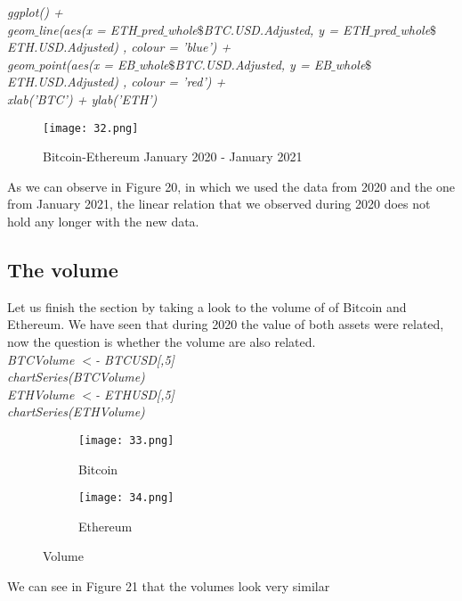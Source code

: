 \documentclass[14pt]{amsart}
\begin{document}
\noindent \textit{ggplot() +}\\
\indent \textit{geom$\_$line(aes(x = ETH$\_$pred$\_$whole$\$$BTC.USD.Adjusted, y = ETH$\_$pred$\_$whole$\$$ETH.USD.Adjusted) , colour = 'blue') +}\\
\indent \textit{geom$\_$point(aes(x = EB$\_$whole$\$$BTC.USD.Adjusted, y = EB$\_$whole$\$$ETH.USD.Adjusted) , colour = 'red') +}\\
\indent \textit{xlab('BTC') + ylab('ETH')}\\

\begin{figure}[h!]
  \texttt{[image: 32.png]}
  \caption{Bitcoin-Ethereum January 2020 - January 2021}
  \label{fig:boat1}
\end{figure}

As we can observe in Figure 20, in which we used the data from 2020 and the one from January 2021, the linear relation that we observed during 2020 does not hold any longer with the new data.

\subsection{The volume}
Let us finish the section by taking a look to the volume of of Bitcoin and Ethereum. We have seen that during 2020 the value of both assets were related, now the question is whether the volume are also related.\\

\noindent \textit{BTCVolume $<$- BTCUSD[,5]}\\
\noindent \textit{chartSeries(BTCVolume)}\\

\noindent \textit{ETHVolume $<$- ETHUSD[,5]}\\
\noindent \textit{chartSeries(ETHVolume)}\\

\begin{figure}[h!]
  \centering
  \begin{subfigure}[b]{0.4\linewidth}
    \texttt{[image: 33.png]}
    \caption{Bitcoin}
  \end{subfigure}
  \begin{subfigure}[b]{0.4\linewidth}
    \texttt{[image: 34.png]}
    \caption{Ethereum}
  \end{subfigure}
  \caption{Volume}
\end{figure}

We can see in Figure 21 that the volumes look very similar
\end{document}
